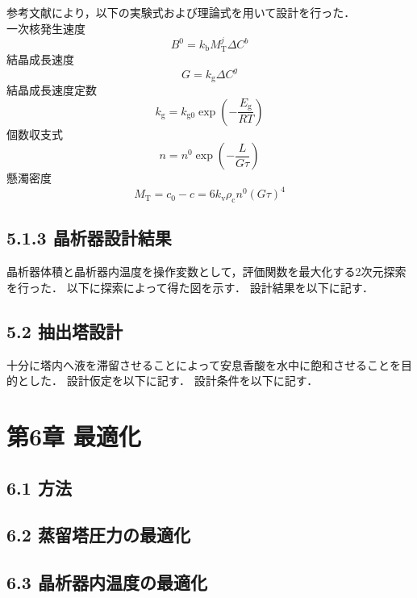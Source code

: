 \documentclass[a4j, titlepage]{jsarticle}
\begin{document}
参考文献\cite{article1}により，以下の実験式および理論式を用いて設計を行った．\\
一次核発生速度
\begin{equation}
    B^0 = k_\mathrm{b} M_\mathrm{T}^j \Delta C^b
\end{equation}
結晶成長速度
\begin{equation}
    G = k_\mathrm{g}\Delta C^g
\end{equation}
結晶成長速度定数
\begin{equation}
    k_\mathrm{g} = k_\mathrm{g0} \exp \left( -\frac{E_\mathrm{g}}{RT} \right)
\end{equation}
個数収支式
\begin{equation}
    n=n^0 \exp \left( -\frac{L}{G\tau} \right)
\end{equation}
懸濁密度
\begin{equation}
    M_\mathrm{T} = c_0-c = 6k_\mathrm{v} \rho_\mathrm{c} n^0 (G\tau)^4
\end{equation}

\subsection*{5.1.3 晶析器設計結果}
晶析器体積と晶析器内温度を操作変数として，評価関数を最大化する2次元探索を行った．
以下に探索によって得た図を示す．
設計結果を以下に記す．

\subsection*{5.2 抽出塔設計}
十分に塔内へ液を滞留させることによって安息香酸を水中に飽和させることを目的とした．
設計仮定を以下に記す．
設計条件を以下に記す．

\newpage
\section*{第6章 最適化}
\subsection*{6.1 方法}

\subsection*{6.2 蒸留塔圧力の最適化}

\subsection*{6.3 晶析器内温度の最適化}
\end{document}
